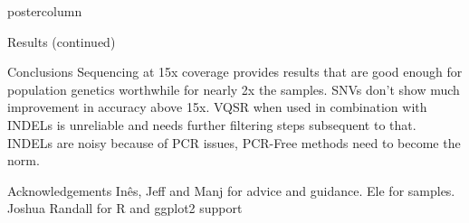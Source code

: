 \documentclass[final,xcolor=table]{beamer}
\begin{document}
\begin{frame}{}
\begin{columns}
\begin{column}{.49\textwidth}
\begin{beamercolorbox}[center,wd=\textwidth]{postercolumn}
\begin{minipage}[T]{.95\textwidth}
\begin{block}{Results (continued)}
            \end{block}
            \begin{block}{Conclusions}
                Sequencing at 15x coverage provides results that are good enough for population genetics worthwhile for nearly 2x the samples. SNVs don't show much improvement in accuracy above 15x. VQSR when used in combination with INDELs is unreliable and needs further filtering steps subsequent to that. INDELs are noisy because of PCR issues, PCR-Free methods need to become the norm.
            \end{block}
            \begin{block}{Acknowledgements}
                Inês, Jeff and Manj for advice and guidance. Ele for samples. Joshua Randall for R and ggplot2 support
            \end{block}
            \vfill


            \end{minipage}
        \end{beamercolorbox}
    \end{column}
    \end{columns}

\end{frame}
\end{document}
